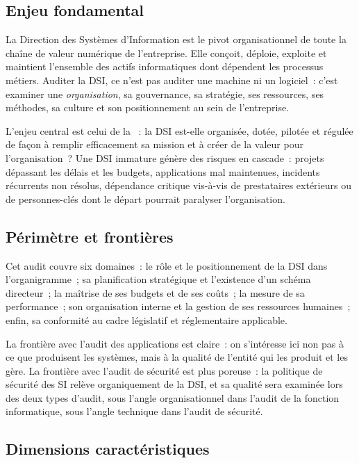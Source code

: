 \subsection{Enjeu fondamental}

La Direction des Systèmes d'Information est le pivot organisationnel de toute
la chaîne de valeur numérique de l'entreprise. Elle conçoit, déploie, exploite
et maintient l'ensemble des actifs informatiques dont dépendent les processus
métiers. Auditer la DSI, ce n'est pas auditer une machine ni un logiciel~: c'est
examiner une \textit{organisation}, sa gouvernance, sa stratégie, ses ressources,
ses méthodes, sa culture et son positionnement au sein de l'entreprise.

L'enjeu central est celui de la ~: la DSI est-elle
organisée, dotée, pilotée et régulée de façon à remplir efficacement sa mission
et à créer de la valeur pour l'organisation~? Une DSI immature génère des risques
en cascade~: projets dépassant les délais et les budgets, applications mal maintenues,
incidents récurrents non résolus, dépendance critique vis-à-vis de prestataires
extérieurs ou de personnes-clés dont le départ pourrait paralyser l'organisation.

\subsection{Périmètre et frontières}

Cet audit couvre six domaines~: le rôle et le positionnement de la DSI dans
l'organigramme~; sa planification stratégique et l'existence d'un schéma directeur~;
la maîtrise de ses budgets et de ses coûts~; la mesure de sa performance~; son
organisation interne et la gestion de ses ressources humaines~; enfin, sa conformité
au cadre législatif et réglementaire applicable.

La frontière avec l'audit des applications est claire~: on s'intéresse ici non pas
à ce que produisent les systèmes, mais à la qualité de l'entité qui les produit et
les gère. La frontière avec l'audit de sécurité est plus poreuse~: la politique de
sécurité des SI relève organiquement de la DSI, et sa qualité sera examinée lors
des deux types d'audit, sous l'angle organisationnel dans l'audit de la fonction
informatique, sous l'angle technique dans l'audit de sécurité.

\subsection{Dimensions caractéristiques}

